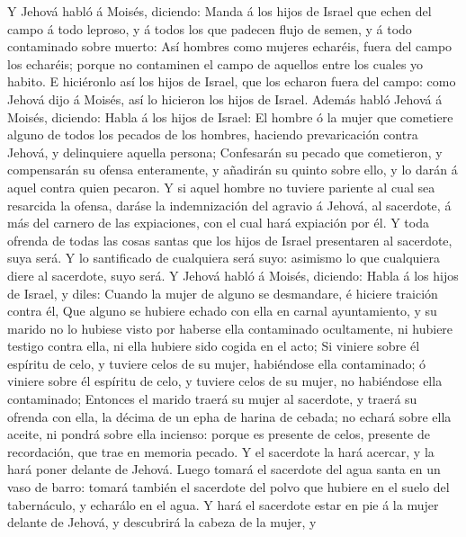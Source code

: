  Y Jehová habló á Moisés, diciendo:  Manda á
los hijos de Israel que echen del campo á todo leproso, y á todos los
que padecen flujo de semen, y á todo contaminado sobre muerto:
 Así hombres como mujeres echaréis, fuera del campo los
echaréis; porque no contaminen el campo de aquellos entre los cuales yo
habito.  E hiciéronlo así los hijos de Israel, que los
echaron fuera del campo: como Jehová dijo á Moisés, así lo hicieron los
hijos de Israel.  Además habló Jehová á Moisés, diciendo:
 Habla á los hijos de Israel: El hombre ó la mujer que
cometiere alguno de todos los pecados de los hombres, haciendo
prevaricación contra Jehová, y delinquiere aquella persona;
 Confesarán su pecado que cometieron, y compensarán su
ofensa enteramente, y añadirán su quinto sobre ello, y lo darán á aquel
contra quien pecaron.  Y si aquel hombre no tuviere
pariente al cual sea resarcida la ofensa, daráse la indemnización del
agravio á Jehová, al sacerdote, á más del carnero de las expiaciones,
con el cual hará expiación por él.  Y toda ofrenda de
todas las cosas santas que los hijos de Israel presentaren al sacerdote,
suya será.  Y lo santificado de cualquiera será suyo:
asimismo lo que cualquiera diere al sacerdote, suyo será.
 Y Jehová habló á Moisés, diciendo:  Habla
á los hijos de Israel, y diles: Cuando la mujer de alguno se desmandare,
é hiciere traición contra él,  Que alguno se hubiere
echado con ella en carnal ayuntamiento, y su marido no lo hubiese visto
por haberse ella contaminado ocultamente, ni hubiere testigo contra
ella, ni ella hubiere sido cogida en el acto;  Si viniere
sobre él espíritu de celo, y tuviere celos de su mujer, habiéndose ella
contaminado; ó viniere sobre él espíritu de celo, y tuviere celos de su
mujer, no habiéndose ella contaminado;  Entonces el
marido traerá su mujer al sacerdote, y traerá su ofrenda con ella, la
décima de un epha de harina de cebada; no echará sobre ella aceite, ni
pondrá sobre ella incienso: porque es presente de celos, presente de
recordación, que trae en memoria pecado.  Y el sacerdote
la hará acercar, y la hará poner delante de Jehová. 
Luego tomará el sacerdote del agua santa en un vaso de barro: tomará
también el sacerdote del polvo que hubiere en el suelo del tabernáculo,
y echarálo en el agua.  Y hará el sacerdote estar en pie
á la mujer delante de Jehová, y descubrirá la cabeza de la mujer, y
